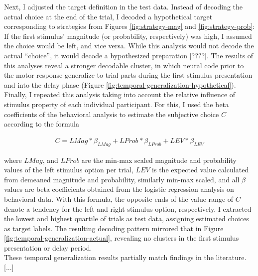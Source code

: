 Next, I adjusted the target definition in the test data.
Instead of decoding the actual choice at the end of the trial, I decoded a hypothetical target corresponding to strategies from Figures \ref{fig:strategy-mag} and \ref{fig:strategy-prob}:
If the first stimulus' magnitude (or probability, respectively) was high, I assumed the choice would be left, and vice versa.
While this analysis would not decode the actual ``choice'', it would decode a hypothesized preparation [????].
The results of this analyses reveal a stronger decodable cluster, in which neural code prior to the motor response generalize to trial parts during the first stimulus presentation and into the delay phase (Figure \ref{fig:temporal-generalization-hypothetical}). \\
Finally, I repeated this analysis taking into account the relative influence of stimulus property of each individual participant.
For this, I used the beta coefficients of the behavioral analysis to estimate the subjective choice $C$ according to the formula

\begin{equation}
	\begin{aligned}
	C = LMag * \beta_{LMag} + LProb * \beta_{LProb} + LEV * \beta_{LEV}
	\end{aligned}
\end{equation}

where $LMag$, and $LProb$ are the min-max scaled magnitude and probability values of the left stimulus option per trial, $LEV$ is the expected value calculated from demeaned magnitude and probability, similarly min-max scaled, and all $\beta$ values are beta coefficients obtained from the logistic regression analysis on behavioral data.
With this formula, the opposite ends of the value range of $C$ denote a tendency for the left and right stimulus option, respectively.
I extracted the lowest and highest quartile of trials as test data, assigning estimated choices as target labels.
The resulting decoding pattern mirrored that in Figure \ref{fig:temporal-generalization-actual}, revealing no clusters in the first stimulus presentation or delay period.\\
These temporal generalization results partially match findings in the literature.
[...]


